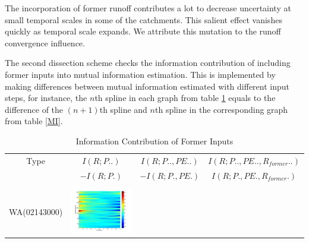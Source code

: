 \documentclass[11pt]{article}
\begin{document}
The incorporation of former runoff contributes a lot to decrease uncertainty at small temporal scales in some of the catchments. This salient effect vanishes quickly as temporal scale expands. We attribute this  mutation to the runoff convergence influence.     
 

The second dissection scheme checks the information contribution of including former inputs into mutual information estimation. This is implemented by making differences between mutual information estimated with different input steps, for instance, the $n$th spline in each graph from table \ref{former}  equals to the difference of the   $(n+1)$th spline and  $n$th spline in the corresponding graph from table \ref{MI}.

\begin{table}[H]\small
\caption{Information Contribution of Former Inputs}
\label{former}
\resizebox{\textwidth}{!}
{
\centering
\begin{tabular}{cccc}
\toprule
Type&$I(R;P..)$&$I(R;P..,PE..) $&$I(R;P..,PE..,R_{former}..)$\\
 &$ -I(R;P.)$ &$ -I(R;P.,PE.)$&$I(R;P.,PE.,R_{former}.)$\\\hline
\\
WA(02143000)
&\begin{minipage}{.3\textwidth}\includegraphics[width=\linewidth]{resultgraph/02143000pdiff_former.png}\end{minipage}

\end{tabular}}
\end{table}
\end{document}
